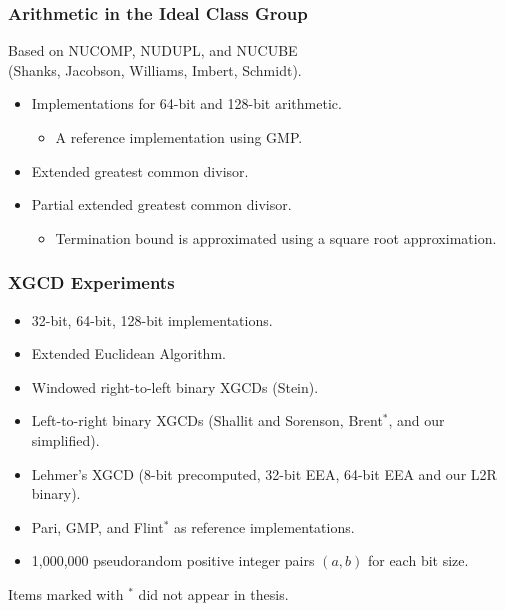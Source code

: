 \documentclass{beamer}
\newcommand{\smallfont}{\fontsize{6pt}{7.2}\selectfont}
\begin{document}
  
\begin{frame}
\frametitle{Arithmetic in the Ideal Class Group}
Based on NUCOMP, NUDUPL, and NUCUBE \\(Shanks, Jacobson, Williams, Imbert, Schmidt).

\begin{itemize}
\item Implementations for 64-bit and 128-bit arithmetic.
	\begin{itemize}
	\item A reference implementation using GMP.
	\end{itemize}
\item Extended greatest common divisor.
\item Partial extended greatest common divisor.
	\begin{itemize}
	\item Termination bound is approximated using a square root approximation.
	\end{itemize}
\end{itemize}

\end{frame}

\begin{frame}
\frametitle{XGCD Experiments}
\begin{itemize}
\item 32-bit, 64-bit, 128-bit implementations.
\item Extended Euclidean Algorithm.
\item Windowed right-to-left binary XGCDs (Stein).
\item Left-to-right binary XGCDs (Shallit and Sorenson, Brent${}^{*}$, and our simplified).
\item Lehmer's XGCD (8-bit precomputed, 32-bit EEA, 64-bit EEA and our L2R binary).
\item Pari, GMP, and Flint${}^{*}$ as reference implementations.
\item 1,000,000 pseudorandom positive integer pairs $(a,b)$ for each bit size.
\end{itemize}

\smallfont
Items marked with ${}^{*}$ did not appear in thesis.
\end{frame}
\end{document}
